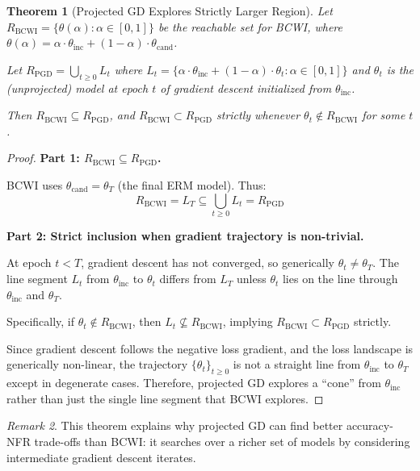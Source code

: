\documentclass[12pt, letterpaper]{article}
\newtheorem{theorem}{Theorem}[section]
\theoremstyle{remark}
\newtheorem{remark}[theorem]{Remark}
\begin{document}
\begin{theorem}[Projected GD Explores Strictly Larger Region]\label{thm:pgd-region}
Let $R_{\mathrm{BCWI}} = \{\theta(\alpha) : \alpha \in [0,1]\}$ be the reachable set for BCWI, where $\theta(\alpha) = \alpha \cdot \theta_{\mathrm{inc}} + (1-\alpha) \cdot \theta_{\mathrm{cand}}$.

Let $R_{\mathrm{PGD}} = \bigcup_{t \geq 0} L_t$ where $L_t = \{\alpha \cdot \theta_{\mathrm{inc}} + (1-\alpha) \cdot \theta_t : \alpha \in [0,1]\}$ and $\theta_t$ is the (unprojected) model at epoch $t$ of gradient descent initialized from $\theta_{\mathrm{inc}}$.

Then $R_{\mathrm{BCWI}} \subseteq R_{\mathrm{PGD}}$, and $R_{\mathrm{BCWI}} \subset R_{\mathrm{PGD}}$ strictly whenever $\theta_t \notin R_{\mathrm{BCWI}}$ for some $t$.
\end{theorem}

\begin{proof}
\textbf{Part 1: $R_{\mathrm{BCWI}} \subseteq R_{\mathrm{PGD}}$.}

BCWI uses $\theta_{\mathrm{cand}} = \theta_T$ (the final ERM model). Thus:
\[
R_{\mathrm{BCWI}} = L_T \subseteq \bigcup_{t \geq 0} L_t = R_{\mathrm{PGD}}
\]

\textbf{Part 2: Strict inclusion when gradient trajectory is non-trivial.}

At epoch $t < T$, gradient descent has not converged, so generically $\theta_t \neq \theta_T$. The line segment $L_t$ from $\theta_{\mathrm{inc}}$ to $\theta_t$ differs from $L_T$ unless $\theta_t$ lies on the line through $\theta_{\mathrm{inc}}$ and $\theta_T$.

Specifically, if $\theta_t \notin R_{\mathrm{BCWI}}$, then $L_t \not\subseteq R_{\mathrm{BCWI}}$, implying $R_{\mathrm{BCWI}} \subset R_{\mathrm{PGD}}$ strictly.

Since gradient descent follows the negative loss gradient, and the loss landscape is generically non-linear, the trajectory $\{\theta_t\}_{t \geq 0}$ is not a straight line from $\theta_{\mathrm{inc}}$ to $\theta_T$ except in degenerate cases. Therefore, projected GD explores a ``cone'' from $\theta_{\mathrm{inc}}$ rather than just the single line segment that BCWI explores.
\end{proof}

\begin{remark}
This theorem explains why projected GD can find better accuracy-NFR trade-offs than BCWI: it searches over a richer set of models by considering intermediate gradient descent iterates.
\end{remark}
\end{document}
